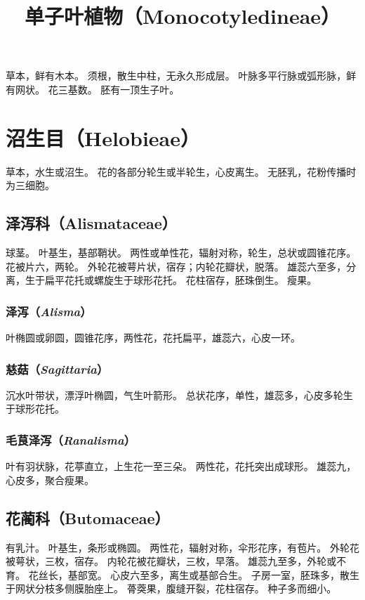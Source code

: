 \documentclass[11pt]{article}
\title{单子叶植物（Monocotyledineae）}
\author{}
\date{}
\begin{document}
\begin{sloppypar}
  \maketitle

  \linenumbers
草本，鲜有木本。
须根，散生中柱，无永久形成层。
叶脉多平行脉或弧形脉，鲜有网状。
花三基数。
胚有一顶生子叶。

\section{沼生目（Helobieae）}
草本，水生或沼生。
花的各部分轮生或半轮生，心皮离生。
无胚乳，花粉传播时为三细胞。

\subsection{泽泻科（Alismataceae）}
球茎。
叶基生，基部鞘状。
两性或单性花，辐射对称，轮生，总状或圆锥花序。
花被片六，两轮。
外轮花被萼片状，宿存；内轮花瓣状，脱落。
雄蕊六至多，分离，生于扁平花托或螺旋生于球形花托。
花柱宿存，胚珠倒生。
瘦果。

\subsubsection{泽泻（\textit{Alisma}）}
叶椭圆或卵圆，圆锥花序，两性花，花托扁平，雄蕊六，心皮一环。

\subsubsection{慈菇（\textit{Sagittaria}）}
沉水叶带状，漂浮叶椭圆，气生叶箭形。
总状花序，单性，雄蕊多，心皮多轮生于球形花托。

\subsubsection{毛茛泽泻（\textit{Ranalisma}）}
叶有羽状脉，花葶直立，上生花一至三朵。
两性花，花托突出成球形。
雄蕊九，心皮多，聚合瘦果。

\subsection{花蔺科（Butomaceae）}
有乳汁。
叶基生，条形或椭圆。
两性花，辐射对称，伞形花序，有苞片。
外轮花被萼状，三枚，宿存。
内轮花被花瓣状，三枚，早落。
雄蕊九至多，外轮或不育。
花丝长，基部宽。
心皮六至多，离生或基部合生。
子房一室，胚珠多，散生于网状分枝多侧膜胎座上。
蓇葖果，腹缝开裂，花柱宿存。
种子多而细小。


\end{sloppypar}
\end{document}
